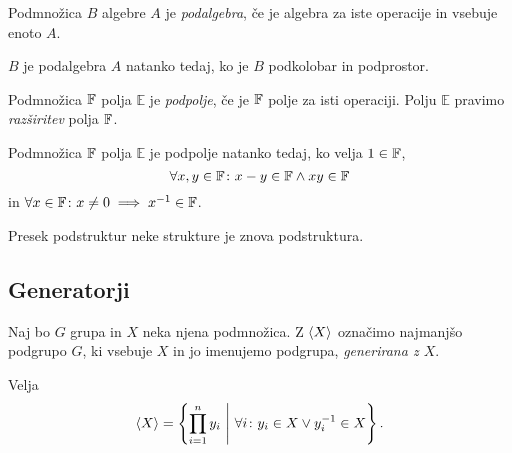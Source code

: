 \obvs

\begin{definicija}
Podmnožica $B$ algebre $A$ je \emph{podalgebra}, če je algebra za iste operacije in vsebuje enoto $A$.
\end{definicija}

\begin{trditev}
$B$ je podalgebra $A$ natanko tedaj, ko je $B$ podkolobar in podprostor.
\end{trditev}

\begin{definicija}
Podmnožica $\mathbb{F}$ polja $\mathbb{E}$ je \emph{podpolje}, če je $\mathbb{F}$ polje za isti operaciji. Polju $\mathbb{E}$ pravimo \emph{razširitev} polja $\mathbb{F}$.
\end{definicija}

\begin{trditev}
Podmnožica $\mathbb{F}$ polja $\mathbb{E}$ je podpolje natanko tedaj, ko velja $1 \in \mathbb{F}$,
\[
\forall x,y \in \mathbb{F} \colon x-y \in \mathbb{F} \land xy \in \mathbb{F}
\]
in $\forall x \in \mathbb{F} \colon x \ne 0 \implies x^{-1} \in \mathbb{F}$.
\end{trditev}

\obvs

\begin{trditev}
Presek podstruktur neke strukture je znova podstruktura.
\end{trditev}

\newpage

\subsection{Generatorji}

\begin{definicija}
Naj bo $G$ grupa in $X$ neka njena podmnožica. Z $\left\langle X\right\rangle$ označimo najmanjšo podgrupo $G$, ki vsebuje $X$ in jo imenujemo podgrupa, \emph{generirana z $X$}.
\end{definicija}

\begin{trditev}
Velja
\[
\left\langle X\right\rangle = \left\{\prod_{i=1}^n y_i~\middle\vert~\forall i \colon y_i \in X \lor y_i^{-1} \in X\right\}.
\]
\end{trditev}

\obvs

